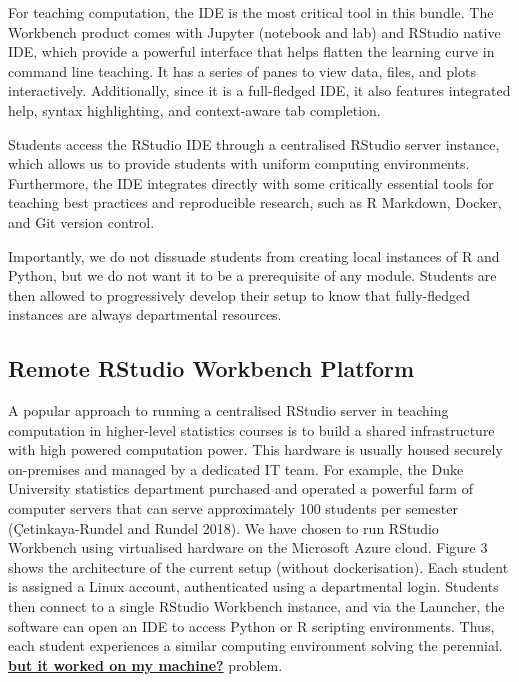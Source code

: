 \documentclass{article}
\begin{document}
For teaching computation, the IDE is the most critical tool in this
bundle. The Workbench product comes with Jupyter (notebook and lab) and
RStudio native IDE, which provide a powerful interface that helps
flatten the learning curve in command line teaching. It has a series of
panes to view data, files, and plots interactively. Additionally, since
it is a full-fledged IDE, it also features integrated help, syntax
highlighting, and context-aware tab completion.

Students access the RStudio IDE through a centralised RStudio server
instance, which allows us to provide students with uniform computing
environments. Furthermore, the IDE integrates directly with some
critically essential tools for teaching best practices and reproducible
research, such as R Markdown, Docker, and Git version control.

Importantly, we do not dissuade students from creating local instances
of R and Python, but we do not want it to be a prerequisite of any
module. Students are then allowed to progressively develop their setup
to know that fully-fledged instances are always departmental resources.

\hypertarget{remote-rstudio-workbench-platform}{%
\subsection{Remote RStudio Workbench
Platform}\label{remote-rstudio-workbench-platform}}

A popular approach to running a centralised RStudio server in teaching
computation in higher-level statistics courses is to build a shared
infrastructure with high powered computation power. This hardware is
usually housed securely on-premises and managed by a dedicated IT team.
For example, the Duke University statistics department purchased and
operated a powerful farm of computer servers that can serve
approximately 100 students per semester (Çetinkaya-Rundel and Rundel
2018). We have chosen to run RStudio Workbench using virtualised
hardware on the Microsoft Azure cloud. Figure 3 shows the architecture
of the current setup (without dockerisation). Each student is assigned a
Linux account, authenticated using a departmental login. Students then
connect to a single RStudio Workbench instance, and via the Launcher,
the software can open an IDE to access Python or R scripting
environments. Thus, each student experiences a similar computing
environment solving the perennial.
\href{https://www.kevinwanke.com/why-you-should-never-use-the-phrase-but-it-works-on-my-machine/}{\textbf{but
it worked on my machine?}} problem.
\end{document}
